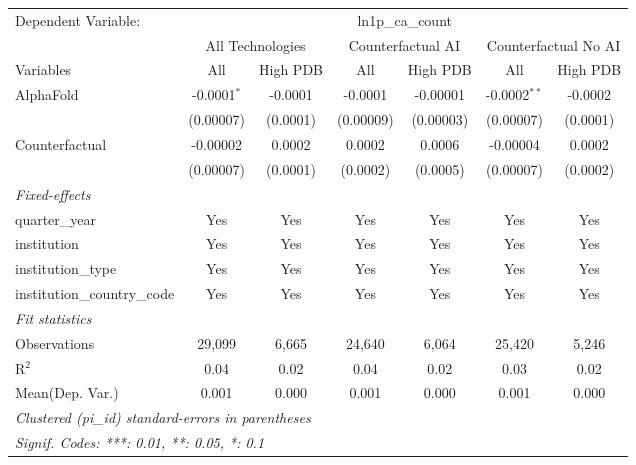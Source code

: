 \begingroup
\centering
\begin{tabular}{lcccccc}
   \tabularnewline \midrule \midrule
   Dependent Variable: & \multicolumn{6}{c}{ln1p\_ca\_count}\\
 & \multicolumn{2}{c}{All Technologies} & \multicolumn{2}{c}{Counterfactual AI} & \multicolumn{2}{c}{Counterfactual No AI} \\
\cmidrule(lr){1-1}\cmidrule(lr){2-3} \cmidrule(lr){4-5} \cmidrule(lr){6-7}
Variables & \multicolumn{1}{c}{All} & \multicolumn{1}{c}{High PDB} & \multicolumn{1}{c}{All} & \multicolumn{1}{c}{High PDB} & \multicolumn{1}{c}{All} & \multicolumn{1}{c}{High PDB} \\
\cmidrule(lr){1-1}\cmidrule(lr){2-2} \cmidrule(lr){3-3} \cmidrule(lr){4-4} \cmidrule(lr){5-5} \cmidrule(lr){6-6} \cmidrule(lr){7-7}
   AlphaFold                    & -0.0001$^{*}$ & -0.0001  & -0.0001   & -0.00001  & -0.0002$^{**}$ & -0.0002\\   
                                & (0.00007)     & (0.0001) & (0.00009) & (0.00003) & (0.00007)      & (0.0001)\\   
   Counterfactual               & -0.00002      & 0.0002   & 0.0002    & 0.0006    & -0.00004       & 0.0002\\   
                                & (0.00007)     & (0.0001) & (0.0002)  & (0.0005)  & (0.00007)      & (0.0002)\\   
   \midrule
   \emph{Fixed-effects}\\
   quarter\_year                & Yes           & Yes      & Yes       & Yes       & Yes            & Yes\\  
   institution                  & Yes           & Yes      & Yes       & Yes       & Yes            & Yes\\  
   institution\_type            & Yes           & Yes      & Yes       & Yes       & Yes            & Yes\\  
   institution\_country\_code   & Yes           & Yes      & Yes       & Yes       & Yes            & Yes\\  
   \midrule
   \emph{Fit statistics}\\
   Observations                 & 29,099        & 6,665    & 24,640    & 6,064     & 25,420         & 5,246\\  
   R$^2$                        & 0.04          & 0.02     & 0.04      & 0.02      & 0.03           & 0.02\\  
Mean(Dep. Var.) & 0.001 & 0.000 & 0.001 & 0.000 & 0.001 & 0.000 \\
   \midrule \midrule
   \multicolumn{7}{l}{\emph{Clustered (pi\_id) standard-errors in parentheses}}\\
   \multicolumn{7}{l}{\emph{Signif. Codes: ***: 0.01, **: 0.05, *: 0.1}}\\
\end{tabular}
\par\endgroup
